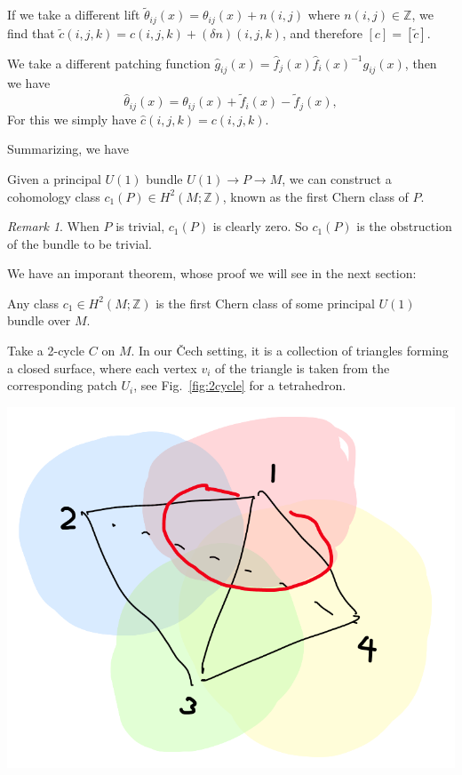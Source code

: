 \documentclass[12pt]{article}
\numberwithin{equation}{section}
\numberwithin{figure}{section}
\theoremstyle{remark}
\newtheorem{remark}[definition]{Remark}
\renewenvironment{figure}[1][]{
  \begin{originalfigure}[#1]
    \begin{mdframed}[linecolor=black!0,backgroundcolor=black!1]
}{
    \end{mdframed}
  \end{originalfigure}
}
\def\bZ{\mathbb{Z}}
\begin{document}
If we take a different lift $\tilde \theta_{ij} (x) = \theta_{ij}(x) + n(i,j)$ where $n(i,j)\in \bZ$,
we find that $\tilde c(i,j,k)= c(i,j,k) +(\delta n)(i,j,k)$,
and therefore $[c]=[\tilde c]$.

We take a different patching function $\hat g_{ij}(x) = \hat f_j(x) \hat f_i(x)^{-1} g_{ij}(x)$,
then we have \begin{equation}
\hat \theta_{ij}(x)= \theta_{ij}(x) + \tilde f_i(x)-\tilde f_j(x),
\end{equation} For this we simply have $\hat c(i,j,k)=c(i,j,k)$.

Summarizing, we have
\begin{proposition}
Given a principal $U(1)$ bundle $U(1)\to P\to M$,
we can construct a cohomology class $c_1(P)\in H^2(M;\bZ)$,
known as the first Chern class of $P$.
\end{proposition}

\begin{remark}
When $P$ is trivial, $c_1(P)$ is clearly zero.
So $c_1(P)$ is the obstruction of the bundle to be trivial.
\end{remark}


We have an imporant theorem, whose proof we will see in the next section:
\begin{theorem}
Any class $c_1\in H^2(M;\bZ)$ is the first Chern class of some principal $U(1)$ bundle over $M$.
\end{theorem}


Take a 2-cycle $C$ on $M$. 
In our \v Cech setting, it is a collection of triangles forming a closed surface,
where each vertex $v_i$ of the triangle is taken from the corresponding patch $U_i$, see Fig.~\ref{fig:2cycle} for a tetrahedron.

\begin{figure}
\centering
\includegraphics[width=.3\textwidth]{c1.png}
\caption{A 2-cycle $C$ on $M$ \label{fig:2cycle}}
\end{figure}
\end{document}
